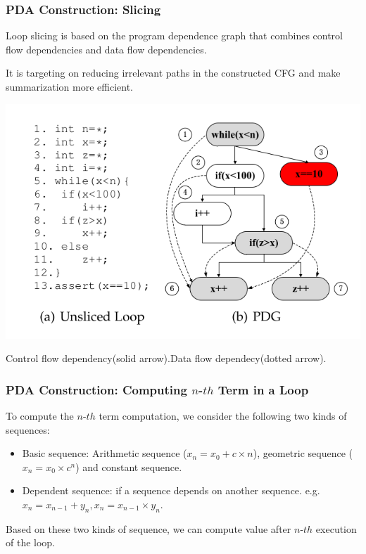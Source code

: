 \documentclass[11pt]{beamer}
\begin{document}
\begin{frame}\frametitle{PDA Construction: Slicing}
Loop slicing is based on the program dependence graph that combines control flow dependencies and data flow dependencies. 

It is targeting on reducing irrelevant paths in the constructed CFG and make summarization more efficient.

\begin{example}[Slicing]
\begin{center}
\includegraphics[scale=0.29]{slicing.png}
\end{center}
\end{example}

Control flow dependency(solid arrow).Data flow dependecy(dotted arrow).
\end{frame}

\begin{frame}\frametitle{PDA Construction: Computing $n$-$th$ Term in a Loop}
To compute the $n$-$th$ term computation, we consider the following two kinds of sequences:
\begin{itemize}
\item Basic sequence: Arithmetic sequence ($x_n = x_0  + c \times n$), geometric sequence ($x_n = x_0 \times c^n$) and constant sequence.

\item Dependent sequence: if a sequence depends on another sequence. e.g. $x_n = x_{n - 1} + y_n, x_n =x_{n - 1} \times y_n$.
\end{itemize}
Based on these two kinds of sequence, we can compute value after $n$-$th$ execution of the loop. 
\end{frame}
\end{document}
